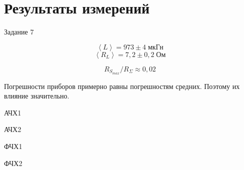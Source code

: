 \section{Результаты измерений}
\begin{table}[!ht]
    \centering
    \caption{Задание 7}
    \resizebox{\columnwidth}{!}{}
\end{table}
\[
    \left<L\right> = 973 \pm 4\;\text{мкГн}
\]
\[
    \left<R_{L}\right> = 7{,}2 \pm 0{,}2\;\text{Ом}
\]

\[
    R_{S_{max}} / R_{ \Sigma} \approx 0{,}02
\]

Погрешности приборов примерно равны погрешностям средних. Поэтому их влияние значительно.

\begin{table}[!ht]
    \centering
    \caption{АЧХ1}
    
\end{table}

\begin{table}[!ht]
    \centering
    \caption{АЧХ2}
    
\end{table}

\begin{table}[!ht]
    \centering
    \caption{ФЧХ1}
    
\end{table}

\begin{table}[!ht]
    \centering
    \caption{ФЧХ2}
    
\end{table}


\begin{figure}[ht!]
\end{figure}

